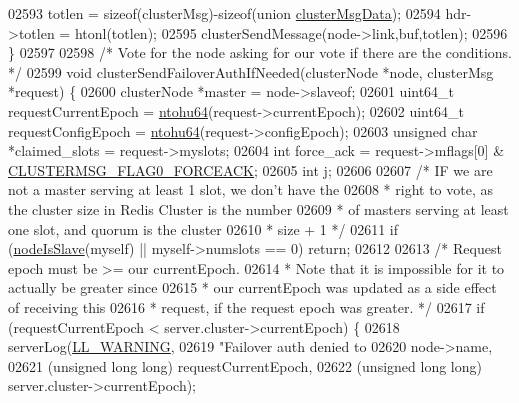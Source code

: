 \begin{DoxyCode}
{{{{{{{{{{{{{{{{{{{{{{{{{{{{{{{{{{{{{{{{02593     totlen = \textcolor{keyword}{sizeof}(clusterMsg)-\textcolor{keyword}{sizeof}(\textcolor{keyword}{union} \hyperlink{unionclusterMsgData}{clusterMsgData});
02594     hdr->totlen = htonl(totlen);
02595     clusterSendMessage(node->link,buf,totlen);
02596 \}
02597 
02598 \textcolor{comment}{/* Vote for the node asking for our vote if there are the conditions. */}
02599 \textcolor{keywordtype}{void} clusterSendFailoverAuthIfNeeded(clusterNode *node, clusterMsg *request) \{
02600     clusterNode *master = node->slaveof;
02601     uint64\_t requestCurrentEpoch = \hyperlink{endianconv_8h_ab6e7416a2faac85cd6d50180e7348a1b}{ntohu64}(request->currentEpoch);
02602     uint64\_t requestConfigEpoch = \hyperlink{endianconv_8h_ab6e7416a2faac85cd6d50180e7348a1b}{ntohu64}(request->configEpoch);
02603     \textcolor{keywordtype}{unsigned} \textcolor{keywordtype}{char} *claimed\_slots = request->myslots;
02604     \textcolor{keywordtype}{int} force\_ack = request->mflags[0] & \hyperlink{cluster_8h_a28600533c792367de5ec4fe2e8434376}{CLUSTERMSG\_FLAG0\_FORCEACK};
02605     \textcolor{keywordtype}{int} j;
02606 
02607     \textcolor{comment}{/* IF we are not a master serving at least 1 slot, we don't have the}
02608 \textcolor{comment}{     * right to vote, as the cluster size in Redis Cluster is the number}
02609 \textcolor{comment}{     * of masters serving at least one slot, and quorum is the cluster}
02610 \textcolor{comment}{     * size + 1 */}
02611     \textcolor{keywordflow}{if} (\hyperlink{cluster_8h_a3c99881f6892130c902b42b1f84a0e11}{nodeIsSlave}(myself) || myself->numslots == 0) \textcolor{keywordflow}{return};
02612 
02613     \textcolor{comment}{/* Request epoch must be >= our currentEpoch.}
02614 \textcolor{comment}{     * Note that it is impossible for it to actually be greater since}
02615 \textcolor{comment}{     * our currentEpoch was updated as a side effect of receiving this}
02616 \textcolor{comment}{     * request, if the request epoch was greater. */}
02617     \textcolor{keywordflow}{if} (requestCurrentEpoch < server.cluster->currentEpoch) \{
02618         serverLog(\hyperlink{server_8h_a31229b9334bba7d6be2a72970967a14b}{LL\_WARNING},
02619             \textcolor{stringliteral}{"Failover auth denied to %
02620             node->name,
02621             (\textcolor{keywordtype}{unsigned} \textcolor{keywordtype}{long} \textcolor{keywordtype}{long}) requestCurrentEpoch,
02622             (\textcolor{keywordtype}{unsigned} \textcolor{keywordtype}{long} \textcolor{keywordtype}{long}) server.cluster->currentEpoch);
}}}}}}}}}}}}}}}}}}}}}}}}}}}}}}}}}}}}}}}}}
\end{DoxyCode}
